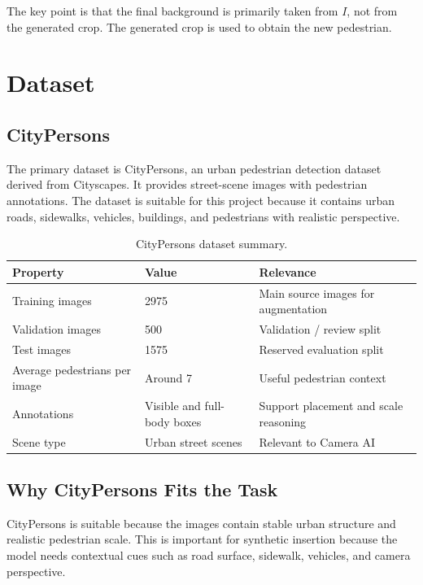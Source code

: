 \documentclass[12pt,a4paper]{article}
\begin{document}
The key point is that the final background is primarily taken from $I$, not from
the generated crop. The generated crop is used to obtain the new pedestrian.

\section{Dataset}

\subsection{CityPersons}

The primary dataset is CityPersons, an urban pedestrian detection dataset
derived from Cityscapes. It provides street-scene images with pedestrian
annotations. The dataset is suitable for this project because it contains urban
roads, sidewalks, vehicles, buildings, and pedestrians with realistic
perspective.

\begin{table}[H]
\centering
\caption{CityPersons dataset summary.}
\label{tab:citypersons_summary}
\begin{tabular}{lll}
\toprule
\textbf{Property} & \textbf{Value} & \textbf{Relevance} \\
\midrule
Training images & 2975 & Main source images for augmentation \\
Validation images & 500 & Validation / review split \\
Test images & 1575 & Reserved evaluation split \\
Average pedestrians per image & Around 7 & Useful pedestrian context \\
Annotations & Visible and full-body boxes & Support placement and scale reasoning \\
Scene type & Urban street scenes & Relevant to Camera AI \\
\bottomrule
\end{tabular}
\end{table}

\subsection{Why CityPersons Fits the Task}

CityPersons is suitable because the images contain stable urban structure and
realistic pedestrian scale. This is important for synthetic insertion because
the model needs contextual cues such as road surface, sidewalk, vehicles, and
camera perspective.
\end{document}
